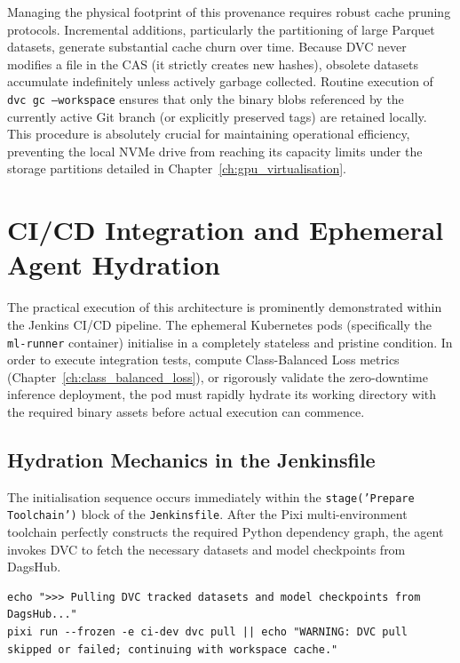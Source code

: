 Managing the physical footprint of this provenance requires robust cache pruning protocols. Incremental additions, particularly the partitioning of large Parquet datasets, generate substantial cache churn over time. Because DVC never modifies a file in the CAS (it strictly creates new hashes), obsolete datasets accumulate indefinitely unless actively garbage collected. Routine execution of \texttt{dvc gc --workspace} ensures that only the binary blobs referenced by the currently active Git branch (or explicitly preserved tags) are retained locally. This procedure is absolutely crucial for maintaining operational efficiency, preventing the local NVMe drive from reaching its capacity limits under the storage partitions detailed in Chapter~\ref{ch:gpu_virtualisation}.

\section{CI/CD Integration and Ephemeral Agent Hydration}
\label{sec:ci_cd_integration}

The practical execution of this architecture is prominently demonstrated within the Jenkins CI/CD pipeline. The ephemeral Kubernetes pods (specifically the \texttt{ml-runner} container) initialise in a completely stateless and pristine condition. In order to execute integration tests, compute Class-Balanced Loss metrics (Chapter~\ref{ch:class_balanced_loss}), or rigorously validate the zero-downtime inference deployment, the pod must rapidly hydrate its working directory with the required binary assets before actual execution can commence.

\subsection{Hydration Mechanics in the Jenkinsfile}
The initialisation sequence occurs immediately within the \texttt{stage('Prepare Toolchain')} block of the \texttt{Jenkinsfile}. After the Pixi multi-environment toolchain perfectly constructs the required Python dependency graph, the agent invokes DVC to fetch the necessary datasets and model checkpoints from DagsHub.

\begin{listing}[H]
\begin{verbatim}
echo ">>> Pulling DVC tracked datasets and model checkpoints from DagsHub..."
pixi run --frozen -e ci-dev dvc pull || echo "WARNING: DVC pull skipped or failed; continuing with workspace cache."
\end{verbatim}
\caption{Ephemeral agent hydration logic derived from the \texttt{Jenkinsfile}.}
\label{lst:jenkins_hydration}
\end{listing}

